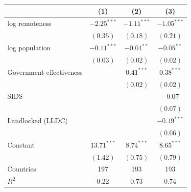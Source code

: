 \begin{tabular}{@{}lccc@{}}
\toprule
 & (1) & (2) & (3) \\
\midrule
log remoteness & $-2.25^{***}$ & $-1.11^{***}$ & $-1.05^{***}$ \\
 & $(0.35)$ & $(0.18)$ & $(0.21)$ \\[2pt]
log population & $-0.11^{***}$ & $-0.04^{**}$ & $-0.05^{**}$ \\
 & $(0.03)$ & $(0.02)$ & $(0.02)$ \\[2pt]
Government effectiveness &  & $0.41^{***}$ & $0.38^{***}$ \\
 &  & $(0.02)$ & $(0.02)$ \\[2pt]
SIDS &  &  & $-0.07$ \\
 &  &  & $(0.07)$ \\[2pt]
Landlocked (LLDC) &  &  & $-0.19^{***}$ \\
 &  &  & $(0.06)$ \\[2pt]
Constant & $13.71^{***}$ & $8.74^{***}$ & $8.65^{***}$ \\
 & $(1.42)$ & $(0.75)$ & $(0.79)$ \\[2pt]
\midrule
Countries & 197 & 193 & 193 \\
$R^2$ & 0.22 & 0.73 & 0.74 \\
\bottomrule
\end{tabular}

